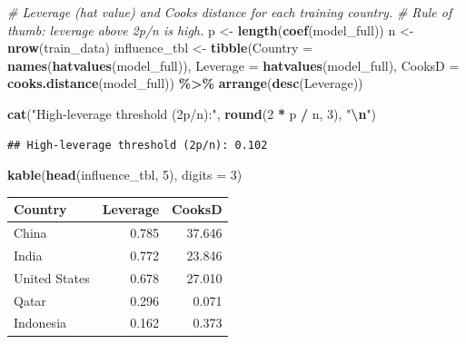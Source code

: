 \documentclass[
]{article}
\newenvironment{Shaded}{\begin{snugshade}}{\end{snugshade}}
\newcommand{\AttributeTok}[1]{\textcolor[rgb]{0.13,0.29,0.53}{#1}}
\newcommand{\CommentTok}[1]{\textcolor[rgb]{0.56,0.35,0.01}{\textit{#1}}}
\newcommand{\DecValTok}[1]{\textcolor[rgb]{0.00,0.00,0.81}{#1}}
\newcommand{\FunctionTok}[1]{\textcolor[rgb]{0.13,0.29,0.53}{\textbf{#1}}}
\newcommand{\NormalTok}[1]{#1}
\newcommand{\OtherTok}[1]{\textcolor[rgb]{0.56,0.35,0.01}{#1}}
\newcommand{\SpecialCharTok}[1]{\textcolor[rgb]{0.81,0.36,0.00}{\textbf{#1}}}
\newcommand{\StringTok}[1]{\textcolor[rgb]{0.31,0.60,0.02}{#1}}
\newcounter{none} %
\begin{document}
\begin{Shaded}
\begin{Highlighting}[]
\CommentTok{\# Leverage (hat value) and Cook\textquotesingle{}s distance for each training country.}
\CommentTok{\# Rule of thumb: leverage above 2p/n is high.}
\NormalTok{p }\OtherTok{\textless{}{-}} \FunctionTok{length}\NormalTok{(}\FunctionTok{coef}\NormalTok{(model\_full))}
\NormalTok{n }\OtherTok{\textless{}{-}} \FunctionTok{nrow}\NormalTok{(train\_data)}
\NormalTok{influence\_tbl }\OtherTok{\textless{}{-}} \FunctionTok{tibble}\NormalTok{(}\AttributeTok{Country =} \FunctionTok{names}\NormalTok{(}\FunctionTok{hatvalues}\NormalTok{(model\_full)),}
                        \AttributeTok{Leverage =} \FunctionTok{hatvalues}\NormalTok{(model\_full),}
                        \AttributeTok{CooksD =} \FunctionTok{cooks.distance}\NormalTok{(model\_full)) }\SpecialCharTok{\%\textgreater{}\%}
  \FunctionTok{arrange}\NormalTok{(}\FunctionTok{desc}\NormalTok{(Leverage))}

\FunctionTok{cat}\NormalTok{(}\StringTok{"High{-}leverage threshold (2p/n):"}\NormalTok{, }\FunctionTok{round}\NormalTok{(}\DecValTok{2} \SpecialCharTok{*}\NormalTok{ p }\SpecialCharTok{/}\NormalTok{ n, }\DecValTok{3}\NormalTok{), }\StringTok{"}\SpecialCharTok{\textbackslash{}n}\StringTok{"}\NormalTok{)}
\end{Highlighting}
\end{Shaded}

\begin{verbatim}
## High-leverage threshold (2p/n): 0.102
\end{verbatim}

\begin{Shaded}
\begin{Highlighting}[]
\FunctionTok{kable}\NormalTok{(}\FunctionTok{head}\NormalTok{(influence\_tbl, }\DecValTok{5}\NormalTok{), }\AttributeTok{digits =} \DecValTok{3}\NormalTok{)}
\end{Highlighting}
\end{Shaded}

{\def\LTcaptype{none} %
\begin{longtable}[]{@{}lrr@{}}
\toprule\noalign{}
Country & Leverage & CooksD \\
\midrule\noalign{}
\endhead
\bottomrule\noalign{}
\endlastfoot
China & 0.785 & 37.646 \\
India & 0.772 & 23.846 \\
United States & 0.678 & 27.010 \\
Qatar & 0.296 & 0.071 \\
Indonesia & 0.162 & 0.373 \\
\end{longtable}
}
\end{document}
